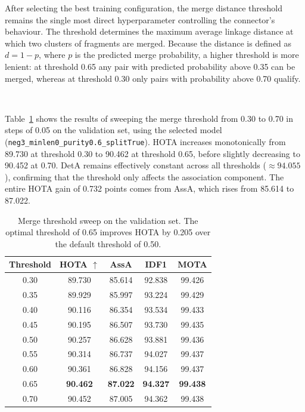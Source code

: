 After selecting the best training configuration, the merge distance threshold remains the single most direct hyperparameter controlling the connector's behaviour. The threshold determines the maximum average linkage distance at which two clusters of fragments are merged. Because the distance is defined as $d = 1 - p$, where $p$ is the predicted merge probability, a higher threshold is more lenient: at threshold 0.65 any pair with predicted probability above 0.35 can be merged, whereas at threshold 0.30 only pairs with probability above 0.70 qualify.

\

Table~\ref{tab:merge_threshold} shows the results of sweeping the merge threshold from 0.30 to 0.70 in steps of 0.05 on the validation set, using the selected model (\texttt{neg3\_minlen0\_purity0.6\_splitTrue}). HOTA increases monotonically from 89.730 at threshold 0.30 to 90.462 at threshold 0.65, before slightly decreasing to 90.452 at 0.70. DetA remains effectively constant across all thresholds ($\approx 94.055$), confirming that the threshold only affects the association component. The entire HOTA gain of 0.732 points comes from AssA, which rises from 85.614 to 87.022.

\begin{table}[H]
\centering
\begin{tabular}{ccccc}
\toprule
\textbf{Threshold} & \textbf{HOTA $\uparrow$} & \textbf{AssA} & \textbf{IDF1} & \textbf{MOTA} \\
\midrule
0.30 & 89.730 & 85.614 & 92.838 & 99.426 \\
0.35 & 89.929 & 85.997 & 93.224 & 99.429 \\
0.40 & 90.116 & 86.354 & 93.534 & 99.433 \\
0.45 & 90.195 & 86.507 & 93.730 & 99.435 \\
0.50 & 90.257 & 86.628 & 93.881 & 99.436 \\
0.55 & 90.314 & 86.737 & 94.027 & 99.437 \\
0.60 & 90.361 & 86.828 & 94.156 & 99.437 \\
0.65 & \textbf{90.462} & \textbf{87.022} & \textbf{94.327} & \textbf{99.438} \\
0.70 & 90.452 & 87.005 & 94.362 & 99.438 \\
\bottomrule
\end{tabular}
\caption{Merge threshold sweep on the validation set. The optimal threshold of 0.65 improves HOTA by 0.205 over the default threshold of 0.50.}
\label{tab:merge_threshold}
\end{table}


